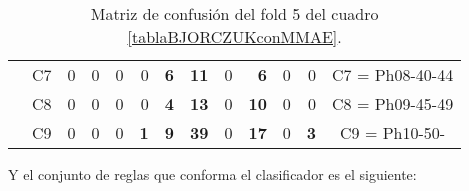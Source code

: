 \begin{table}[H]
{\begin{tabular}{|ccrrrrrrrrrrc|}
\multicolumn{1}{|c|}{}                                      & \multicolumn{1}{c|}{C7} & \multicolumn{1}{r|}{0}  & \multicolumn{1}{r|}{0}          & \multicolumn{1}{r|}{0}          & \multicolumn{1}{r|}{0}          & \multicolumn{1}{r|}{\textbf{6}} & \multicolumn{1}{r|}{\textbf{11}} & \multicolumn{1}{r|}{0}          & \multicolumn{1}{r|}{\textbf{6}}  & \multicolumn{1}{r|}{0}          & \multicolumn{1}{r|}{0}          & C7 = Ph08-40-44   \\ \cline{2-13}
\multicolumn{1}{|c|}{}                                      & \multicolumn{1}{c|}{C8} & \multicolumn{1}{r|}{0}  & \multicolumn{1}{r|}{0}          & \multicolumn{1}{r|}{0}          & \multicolumn{1}{r|}{0}          & \multicolumn{1}{r|}{\textbf{4}} & \multicolumn{1}{r|}{\textbf{13}} & \multicolumn{1}{r|}{0}          & \multicolumn{1}{r|}{\textbf{10}} & \multicolumn{1}{r|}{0}          & \multicolumn{1}{r|}{0}          & C8 = Ph09-45-49   \\ \cline{2-13}
\multicolumn{1}{|c|}{}                                      & \multicolumn{1}{c|}{C9} & \multicolumn{1}{r|}{0}  & \multicolumn{1}{r|}{0}          & \multicolumn{1}{r|}{0}          & \multicolumn{1}{r|}{\textbf{1}} & \multicolumn{1}{r|}{\textbf{9}} & \multicolumn{1}{r|}{\textbf{39}} & \multicolumn{1}{r|}{0}          & \multicolumn{1}{r|}{\textbf{17}} & \multicolumn{1}{r|}{0}          & \multicolumn{1}{r|}{\textbf{3}} & C9 = Ph10-50-     \\ \hline
\end{tabular}%
}
\caption{Matriz de confusión del fold 5 del cuadro \ref{tablaBJORCZUKconMMAE}.}
\end{table}

\newpage

Y el conjunto de reglas que conforma el clasificador es el siguiente:

